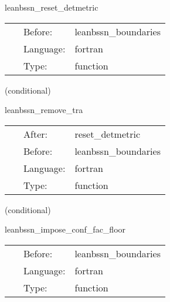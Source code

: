 \hspace{5mm} leanbssn\_reset\_detmetric 

\hspace{5mm}{\it reset dethh = 1 } 


\hspace{5mm}

 \begin{tabular*}{160mm}{cll} 
~ & Before:  & leanbssn\_boundaries \\ 
~ & Language:  & fortran \\ 
~ & Type:  & function \\ 
\end{tabular*} 


\vspace{5mm}

   (conditional) 

\hspace{5mm} leanbssn\_remove\_tra 

\hspace{5mm}{\it remove trace of a } 


\hspace{5mm}

 \begin{tabular*}{160mm}{cll} 
~ & After:  & reset\_detmetric \\ 
~ & Before:  & leanbssn\_boundaries \\ 
~ & Language:  & fortran \\ 
~ & Type:  & function \\ 
\end{tabular*} 


\vspace{5mm}

   (conditional) 

\hspace{5mm} leanbssn\_impose\_conf\_fac\_floor 

\hspace{5mm}{\it make sure conformal factor does not drop below specified value } 


\hspace{5mm}

 \begin{tabular*}{160mm}{cll} 
~ & Before:  & leanbssn\_boundaries \\ 
~ & Language:  & fortran \\ 
~ & Type:  & function \\ 
\end{tabular*} 


